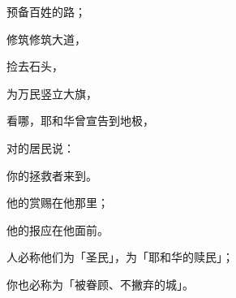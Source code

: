 {\par }{\Q 预备百姓的路；
\par }{\Q 修筑修筑大道，
\par }{\Q 捡去石头，
\par }{\Q 为万民竖立大旗，
\par }{\Q {}看哪，耶和华曾宣告到地极，
\par }{\Q 对{}的居民说：
\par }{\Q 你的拯救者来到。
\par }{\Q 他的赏赐在他那里；
\par }{\Q 他的报应在他面前。
\par }{\Q {}人必称他们为「圣民」，为「耶和华的赎民」；
\par }{\Q 你也必称为「被眷顾、不撇弃的城」。

}
